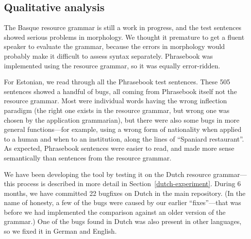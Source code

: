




\subsection{Qualitative analysis} 

The Basque resource grammar is still a work in progress, and the test
sentences showed serious problems in morphology. We thought it
premature to get a fluent speaker to evaluate the grammar, because the
errors in morphology would probably make it difficult to assess syntax
separately. Phrasebook was implemented using the resource grammar, so
it was equally error-ridden.

For Estonian, we read through all the Phrasebook test sentences. These
505 sentences showed a handful of bugs, all coming from Phrasebook
itself not the resource grammar. Most were individual words having the
wrong inflection paradigm (the right one exists in the resource
grammar, but wrong one was chosen by the application grammarian), but
there were also some bugs in more general functions—for example, using
a wrong form of nationality when applied to a human and when to an
institution, along the lines of ``Spaniard restaurant''. As expected,
Phrasebook sentences were easier to read, and made more sense
semantically than sentences from the resource grammar.

We have been developing the tool by testing it on the Dutch resource
grammar---this process is described in more detail in
Section~\ref{dutch-experiment}. During 6 months, we have committed 22
bugfixes on Dutch in the \gf{} main repository. (In the name of
honesty, a few of the bugs were caused by our earlier “fixes”—that was
before we had implemented the comparison against an older version of
the grammar.) One of the bugs found in Dutch was also present in other
languages, so we fixed it in German and English.

